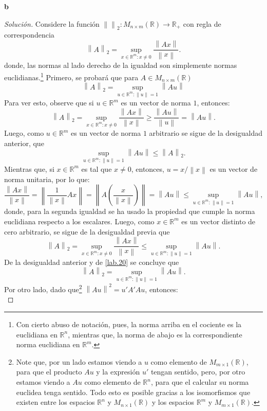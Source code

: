 \documentclass[10.5pt,notitlepage]{article}
\newenvironment{solucion}
  {\begin{proof}[Solución]}
  {\end{proof}}
\newcommand{\RR}{\mathbb{R}}
\newcommand{\norm}[1]{\left\| #1 \right\|}
\newcommand{\pare}[1]{\left( #1 \right)}
\theoremstyle{plain}
\begin{document}
\textbf{b}
\begin{solucion}
Considere la función \(\norm{}_{2}: M_{n \times m}(\RR) \to \RR_{+}\) con regla de correspondencia  
\[
\norm{A}_{2} = \sup_{x\in \RR^{m}: x \neq 0}\frac{\norm{Ax}}{\norm{x}}.
\]
donde, las normas al lado derecho de la igualdad son simplemente normas euclidianas.\footnote{Con cierto abuso de notación, pues, la norma arriba en el cociente es la euclidiana en \(\RR^{n}\), mientras que, la norma de abajo es la correspondiente norma euclidiana en \(\RR^m\). } Primero, se probará que para \(A \in M_{n \times m}(\RR)\)  
\[
\norm{A}_{2} = \sup_{u\in \RR^{m}: \norm{u} = 1}\norm{Au}
\]
Para ver esto, observe que si \(u \in \RR^{m}\) es un vector de norma \(1\), entonces: 
\[
\norm{A}_{2} = \sup_{x\in \RR^{m}: x \neq 0}\frac{\norm{Ax}}{\norm{x}} \geq \frac{\norm{Au}}{\norm{u}} = \norm{Au}. 
\]
Luego, como \(u \in \RR^{m}\) es un vector de norma \(1\) arbitrario se sigue de la desigualdad anterior, que
\begin{equation}\label{lab.20}
\sup_{u\in \RR^{m}: \norm{u} = 1}\norm{Au} \leq \norm{A}_{2}.    
\end{equation}
Mientras que, si \(x \in \RR^{m}\) es tal que \(x \neq 0\), entonces, \(u = x/\norm{x}\) es un vector de norma unitaria, por lo que:
\[
\frac{\norm{Ax}}{\norm{x}}=\norm{\frac{1}{\norm{x}}Ax}= \norm{A\pare{\frac{x}{\norm{x}}}}= \norm{Au} \leq \sup_{u\in \RR^{m}: \norm{u} = 1}\norm{Au},
\]
donde, para la segunda igualdad se ha usado la propiedad que cumple la norma euclidiana respecto a los escalares. Luego, como \(x \in \RR^{m}\) es un vector distinto de cero arbitrario, se sigue de la desigualdad previa que
\[
\norm{A}_{2} = \sup_{x\in \RR^{m}: x \neq 0}\frac{\norm{Ax}}{\norm{x}}\leq \sup_{u\in \RR^{m}: \norm{u} = 1}\norm{Au}. 
\]
De la desigualdad anterior y de \eqref{lab.20} se concluye que 
\begin{equation}\label{lab.21}
\norm{A}_{2} =  \sup_{u\in \RR^{m}: \norm{u} = 1}\norm{Au}.     
\end{equation}
Por otro lado, dado que\footnote{Note que, por un lado estamos viendo a \(u\) como elemento de \(M_{m\times 1}(\RR)\), para que el producto \(Au\) y la expresión \(u'\) tengan sentido, pero, por otro estamos viendo a \(Au\) como elemento de \(\RR^n\), para que el calcular su norma euclidea tenga sentido. Todo esto es posible gracias a los isomorfismos que existen entre los espacios \(\RR^n\) y \(M_{n\times 1}(\RR)\) y los espacios \(\RR^m\) y \(M_{m\times 1}(\RR)\).} \(\norm{Au}^2 = u'A'A u\), entonces: 
\begin{equation}\label{lab.22}

\end{equation}
\end{solucion}
\end{document}
